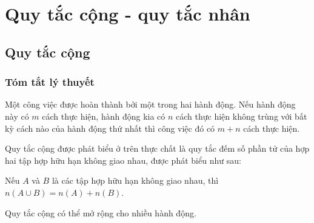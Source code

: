 \setcounter{section}{0}
\section{Quy tắc cộng - quy tắc nhân}
\subsection{Quy tắc cộng}
\subsubsection{Tóm tắt lý thuyết}
\begin{dn}
Một công việc được hoàn thành bởi một trong hai hành động. Nếu hành động này có $m$ cách thực hiện, hành động kia có $n$ cách thực hiện không trùng với bất kỳ cách nào của hành động thứ nhất thì công việc đó có $m + n$ cách thực hiện.
\end{dn}

\begin{note}
Quy tắc cộng được phát biểu ở trên  thực chất là quy tắc đếm số phần tử của hợp hai tập hợp hữu hạn không giao nhau, được phát biểu như sau: 
\begin{center}
Nếu $A$ và $B$ là các tập hợp hữu hạn không giao nhau, thì \\ $n(A \cup B) = n(A) + n(B)$.
\end{center}
\end{note}
\begin{note}
Quy tắc cộng có thể mở rộng cho nhiều hành động.
\end{note}
